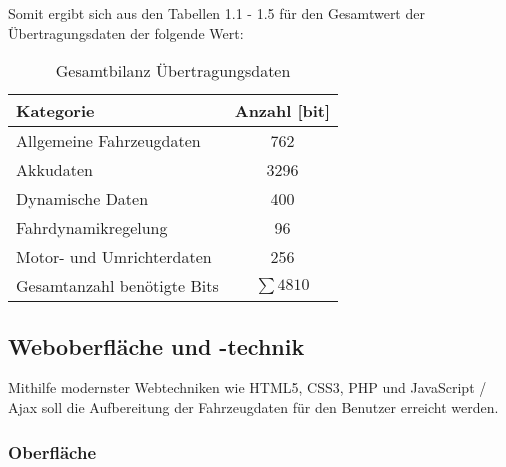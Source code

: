 \documentclass[fontsize = 12pt, paper = a4]{scrreprt}
\begin{document}
\vspace{\baselineskip}
 
 Somit ergibt sich aus den Tabellen 1.1 - 1.5 für den Gesamtwert der Übertragungsdaten der folgende Wert:
 
 \begin{table}[h]
 \caption{Gesamtbilanz Übertragungsdaten}
 
 \begin{tabular}{ l | c }
 
 \toprule[1.5pt]
 \textbf{Kategorie} & \textbf{Anzahl [bit]} \\ 
 
 \midrule
 Allgemeine Fahrzeugdaten    & 762   \\
 Akkudaten                   & 3296  \\
 Dynamische Daten            & 400   \\
 Fahrdynamikregelung         & 96    \\
 Motor- und Umrichterdaten   & 256   \\
 
 
 \midrule
 Gesamtanzahl benötigte Bits & $\sum 4810$ \\
 
 \bottomrule[1.5pt]
 
 \end{tabular}
 
 \end{table} 
 
 \vspace{\baselineskip}

 \newpage


\subsection{Weboberfläche und -technik}

Mithilfe modernster Webtechniken wie \gls{HTML}5, \gls{CSS}3, \gls{PHP} und \gls{JavaScript} / \gls{Ajax} soll die Aufbereitung der Fahrzeugdaten für den Benutzer erreicht werden.

\subsubsection{Oberfläche}
\end{document}
